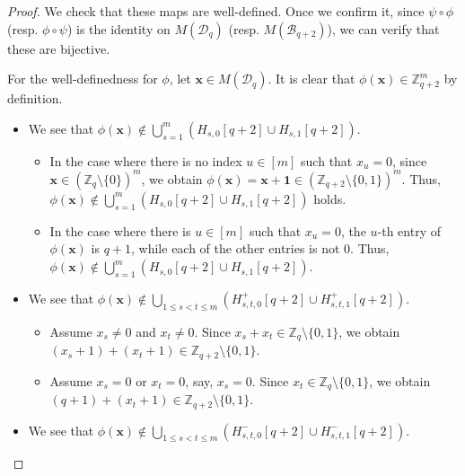 \documentclass[10pt,a4paper]{amsart}
\newcommand{\Bc}{\mathcal{B}}
\newcommand{\Dc}{\mathcal{D}}
\newcommand{\ZZ}{\mathbb{Z}}
\begin{document}
\begin{proof}
We check that these maps are well-defined. Once we confirm it, since $\psi \circ \phi$ (resp. $\phi \circ \psi$) is the identity on $M(\Dc_q)$ (resp. $M(\Bc_{q+2})$), we can verify that these are bijective. 

\medskip

\noindent
For the well-definedness for $\phi$, let $\bm{x} \in M(\Dc_q)$.
It is clear that $\phi(\bm{x}) \in \ZZ_{q+2}^m$ by definition. 
\begin{itemize}
\item We see that $\phi(\bm{x}) \notin \bigcup_{s=1}^m (H_{s,0}[q+2] \cup H_{s,1}[q+2])$. 
    \begin{itemize}
        \item In the case where there is no index $u \in [m]$ such that $x_u = 0$, since $\bm{x} \in (\ZZ_q \setminus \{0\})^m$, we obtain $\phi(\bm{x}) = \bm{x} + \bm{1} \in (\ZZ_{q+2} \setminus \{0,1\})^m$. Thus, $\phi(\bm{x}) \notin \bigcup_{s=1}^m (H_{s,0}[q+2] \cup H_{s,1}[q+2])$ holds.
        \item In the case where there is $u \in [m]$ such that $x_u = 0$, the $u$-th entry of $\phi(\bm{x})$ is $q+1$, while each of the other entries is not $0$. Thus, $\phi(\bm{x}) \notin \bigcup_{s=1}^m (H_{s,0}[q+2] \cup H_{s,1}[q+2])$. 
    \end{itemize}
\item We see that $\phi(\bm{x}) \notin \bigcup_{1 \leq s<t \leq m}(H_{s,t,0}^+[q+2] \cup H_{s,t,1}^+[q+2])$.
    \begin{itemize}
        \item Assume $x_s \neq 0$ and $x_t \neq 0$. Since $x_s + x_t \in \ZZ_q \setminus \{0,1\}$, we obtain $(x_s + 1) + (x_t + 1) \in \ZZ_{q+2} \setminus \{0,1\}$. 
        \item Assume $x_s=0$ or $x_t=0$, say, $x_s=0$. Since $x_t \in \ZZ_q \setminus \{0,1\}$, we obtain $(q+1) + (x_t+1) \in \ZZ_{q+2}\setminus\{0,1\}$. 
    \end{itemize}
\item We see that $\phi(\bm{x}) \notin \bigcup_{1 \leq s<t \leq m}(H_{s,t,0}^-[q+2] \cup H_{s,t,1}^-[q+2])$.

\end{itemize}
\end{proof}
\end{document}
